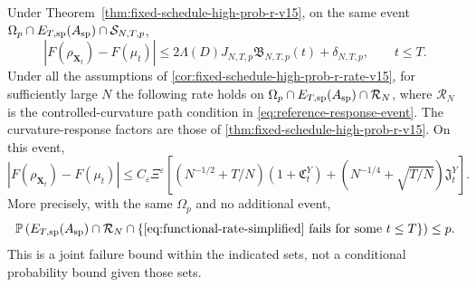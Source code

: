 \begin{theorem}
\label{thm:functional-gap-fixed-schedule-v15}
Under Theorem~\ref{thm:fixed-schedule-high-prob-r-v15}, on the same event
$\Omega_p\cap E_{T,\rm sp}(A_{\rm sp})\cap\mathcal S_{N,T,p}$,
\[
|F(\rho_{\mathbf X_t})-F(\mu_t)|
\le2\Lambda(D)J_{N,T,p}\mathfrak B_{N,T,p}(t)+\delta_{N,T,p},\qquad t\le T.
\]
Under all the assumptions of
\cref{cor:fixed-schedule-high-prob-r-rate-v15}, for sufficiently large $N$
the following rate holds on
$\Omega_p\cap E_{T,\rm sp}(A_{\rm sp})\cap\mathcal R_N$, where
\(\mathcal R_N\) is the controlled-curvature path condition in
\cref{eq:reference-response-event}. The curvature-response factors are those of
\cref{thm:fixed-schedule-high-prob-r-v15}. On this event,
\begin{equation}
\label{eq:functional-rate-simplified}
|F(\rho_{\mathbf X_t})-F(\mu_t)|
\le C_\varepsilon\Xi^\varepsilon
\left[(N^{-1/2}+T/N)(1+\mathfrak C_t^Y)
+(N^{-1/4}+\sqrt{T/N})\mathfrak J_t^Y\right].
\end{equation}
More precisely, with the same $\Omega_p$ and no additional event,
\[
 \mathbb P\left(E_{T,\rm sp}(A_{\rm sp})\cap\mathcal R_N
       \cap\{\eqref{eq:functional-rate-simplified}
                         \text{ fails for some }t\le T\}\right)\le p.
\]
This is a joint failure bound within the indicated sets, not a
conditional probability bound given those sets.
\end{theorem}
